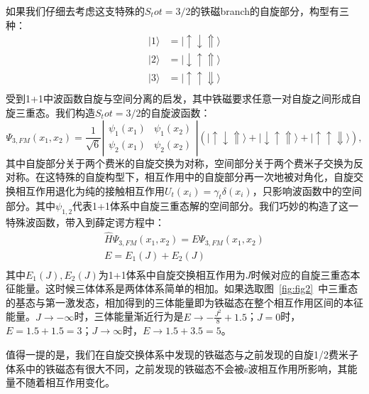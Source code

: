 如果我们仔细去考虑这支特殊的$S_tot=3/2$的铁磁branch的自旋部分，构型有三种：
\begin{equation}
    \begin{split} 
    |1\rangle &= |\uparrow\downarrow\Uparrow\rangle\\
    |2\rangle &= |\downarrow\uparrow\Uparrow\rangle\\
    |3\rangle &= |\uparrow\uparrow\Downarrow\rangle\\
    \end{split}
\end{equation} 
受到1+1中波函数自旋与空间分离的启发，其中铁磁要求任意一对自旋之间形成自旋三重态。我们构造$S_tot=3/2$的自旋波函数：
\begin{equation}
\Psi_{3,FM}(x_1,x_2)=\frac{1}{\sqrt{6}}\left|\begin{array}{cc}\psi_1(x_1) & \psi_1(x_2) \\\psi_2(x_1) & \psi_2(x_2)\end{array}\right| \left(|\uparrow\downarrow\Uparrow\rangle+|\downarrow\uparrow\Uparrow\rangle+|\uparrow\uparrow\Downarrow\rangle\right),
\end{equation}
其中自旋部分关于两个费米的自旋交换为对称，空间部分关于两个费米子交换为反对称。在这特殊的自旋构型下，相互作用中的自旋部分再一次地被对角化，自旋交换相互作用退化为纯的接触相互作用$U_t(x_i)=\gamma_t\delta(x_i)$，只影响波函数中的空间部分。其中$\psi_{1,2}$代表1+1体系中自旋三重态解的空间部分。我们巧妙的构造了这一特殊波函数，带入到薛定谔方程中：
\begin{equation}
\begin{split}
        \hat{H}\Psi_{3,FM}(x_1,x_2) = E\Psi_{3,FM}(x_1,x_2)\\
        E = E_1(J)+E_2(J)\\
\end{split}
\end{equation}
其中$E_1(J), E_2(J)$为1+1体系中自旋交换相互作用为$J$时候对应的自旋三重态本征能量。这时候三体体系是两体体系简单的相加。如果选取图~\ref{fig:fig2}~中三重态的基态与第一激发态，相加得到的三体能量即为铁磁态在整个相互作用区间的本征能量。$J\to-\infty$时，三体能量渐近行为是$E\to-\frac{J^2}{8}+1.5$；$J=0$时，$E=1.5+1.5=3$；$J\to\infty$时，$E\to1.5+3.5=5$。

值得一提的是，我们在自旋交换体系中发现的铁磁态与之前发现的自旋1/2费米子体系中的铁磁态\cite{cui2014ground}有很大不同，之前发现的铁磁态不会被s波相互作用所影响，其能量不随着相互作用变化。

